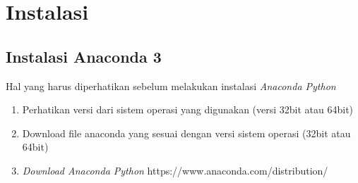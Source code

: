 \section{Instalasi}
\subsection{Instalasi Anaconda 3}
Hal yang harus diperhatikan sebelum melakukan instalasi \textit{Anaconda Python}
\begin{enumerate}
 \item Perhatikan versi dari sistem operasi yang digunakan (versi 32bit atau 64bit)
 \item Download file anaconda yang sesuai dengan versi sistem operasi (32bit atau 64bit)
 \item \textit{Download Anaconda Python} https://www.anaconda.com/distribution/
\end{enumerate}

